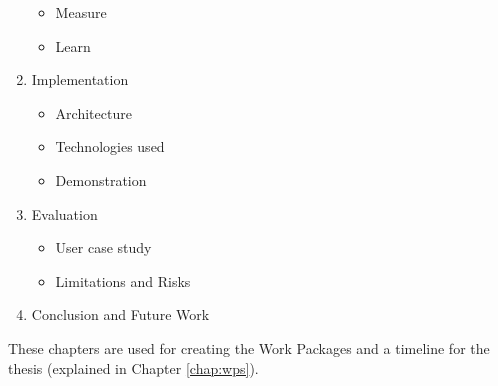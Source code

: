 \begin{enumerate}
\begin{itemize}
		\item Measure
		\item Learn
	\end{itemize}
	\item Implementation
	\begin{itemize}
		\item Architecture
		\item Technologies used
		\item Demonstration
	\end{itemize}
	\item Evaluation
	\begin{itemize}
		\item User case study
		\item Limitations and Risks
	\end{itemize}
	\item Conclusion and Future Work
\end{enumerate}

These chapters are used for creating the Work Packages and a timeline for the thesis (explained in Chapter \ref{chap:wps}).